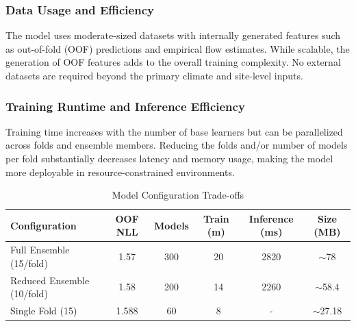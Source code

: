 \documentclass[ruler]{CUP-JNL-EDS}%
\begin{document}
\subsubsection*{Data Usage and Efficiency}
The model uses moderate-sized datasets with internally generated features such as out-of-fold (OOF) predictions and empirical flow estimates. While scalable, the generation of OOF features adds to the overall training complexity. No external datasets are required beyond the primary climate and site-level inputs.

\subsubsection*{Training Runtime and Inference Efficiency}
Training time increases with the number of base learners but can be parallelized across folds and ensemble members. Reducing the folds and/or number of models per fold substantially decreases latency and memory usage, making the model more deployable in resource-constrained environments.

\begin{table}[!htp]
\centering
\caption{Model Configuration Trade-offs}
\begin{tabular}{lccccc}
\hline
\textbf{Configuration} & \textbf{OOF NLL} & \textbf{Models} & \textbf{Train (m)} & \textbf{Inference (ms)} & \textbf{Size (MB)} \\
\hline
Full Ensemble (15/fold) & 1.57 & 300 & ~20 & 2820 & $\sim$78 \\
Reduced Ensemble (10/fold) & 1.58 & 200 & ~14 & 2260 & $\sim$58.4 \\
Single Fold (15) & 1.588 & 60 & ~8 & - & $\sim$27.18 \\

\hline
\end{tabular}
\label{tab:frugality}
\end{table}
\end{document}
